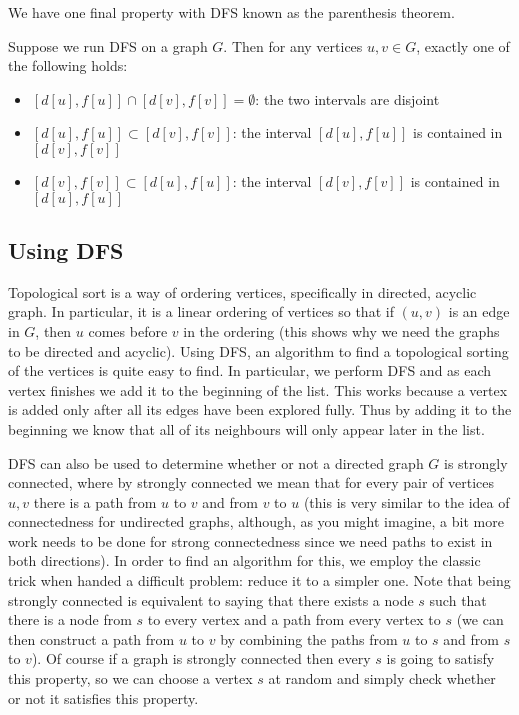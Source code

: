 We have one final property with DFS known as the parenthesis theorem. 
\begin{theorem}
Suppose we run DFS on a graph $G$. Then for any vertices $u, v \in G$, exactly one of the following holds:
\begin{itemize}
    \item $\left[d[u], f[u]\right] \cap \left[d[v], f[v]\right] = \emptyset$: the two intervals are disjoint
    \item $\left[d[u], f[u]\right] \subset \left[d[v], f[v]\right]$: the interval $\left[d[u], f[u]\right]$ is contained in $\left[d[v], f[v]\right]$
    \item $\left[d[v], f[v]\right] \subset \left[d[u], f[u]\right]$: the interval $\left[d[v], f[v]\right]$ is contained in $\left[d[u], f[u]\right]$
\end{itemize}
\end{theorem}

\subsection{Using DFS}
Topological sort is a way of ordering vertices, specifically in directed, acyclic graph. In particular, it is a linear ordering of vertices so that if $(u, v)$ is an edge in $G$, then $u$ comes before $v$ in the ordering (this shows why we need the graphs to be directed and acyclic). Using DFS, an algorithm to find a topological sorting of the vertices is quite easy to find. In particular, we perform DFS and as each vertex finishes we add it to the beginning of the list. This works because a vertex is added only after all its edges have been explored fully. Thus by adding it to the beginning we know that all of its neighbours will only appear later in the list.

DFS can also be used to determine whether or not a directed graph $G$ is strongly connected, where by strongly connected we mean that for every pair of vertices $u, v$ there is a path from $u$ to $v$ and from $v$ to $u$ (this is very similar to the idea of connectedness for undirected graphs, although, as you might imagine, a bit more work needs to be done for strong connectedness since we need paths to exist in both directions). In order to find an algorithm for this, we employ the classic trick when handed a difficult problem: reduce it to a simpler one. Note that being strongly connected is equivalent to saying that there exists a node $s$ such that there is a node from $s$ to every vertex and a path from every vertex to $s$ (we can then construct a path from $u$ to $v$ by combining the paths from $u$ to $s$ and from $s$ to $v$). Of course if a graph is strongly connected then every $s$ is going to satisfy this property, so we can choose a vertex $s$ at random and simply check whether or not it satisfies this property.  

